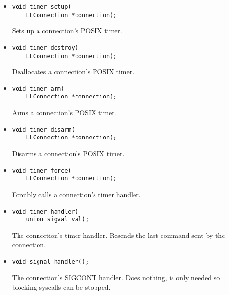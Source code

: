 \documentclass[11pt,a4paper,twocolumn]{article}
\begin{document}
\begin{itemize}
    \item \begin{lstlisting}
void timer_setup(
    LLConnection *connection);
    \end{lstlisting}

          Sets up a connection's POSIX timer.

    \item \begin{lstlisting}
void timer_destroy(
    LLConnection *connection);
    \end{lstlisting}

          Deallocates a connection's POSIX timer.

    \item \begin{lstlisting}
void timer_arm(
    LLConnection *connection);
    \end{lstlisting}

          Arms a connection's POSIX timer.

    \item \begin{lstlisting}
void timer_disarm(
    LLConnection *connection);
    \end{lstlisting}

          Disarms a connection's POSIX timer.

    \item \begin{lstlisting}
void timer_force(
    LLConnection *connection);
    \end{lstlisting}

          Forcibly calls a connection's timer handler.

    \item \begin{lstlisting}
void timer_handler(
    union sigval val);
    \end{lstlisting}

          The connection's timer handler.
          Resends the last command sent by the connection.

    \item \begin{lstlisting}
void signal_handler();
    \end{lstlisting}

          The connection's SIGCONT handler.
          Does nothing, is only needed so blocking syscalls can be stopped.

\end{itemize}
\end{document}
